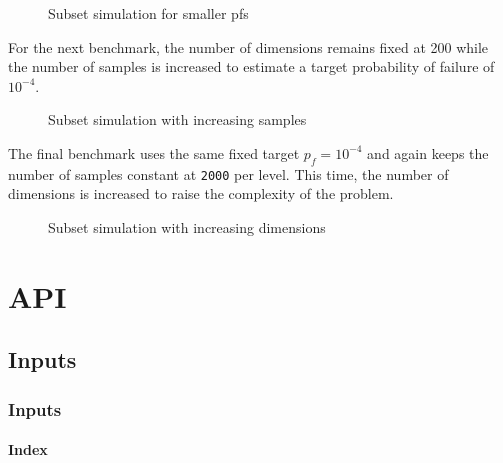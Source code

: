 \begin{figure}
\centering
\caption{Subset simulation for smaller pfs}
\end{figure}




For the next benchmark, the number of dimensions remains fixed at 200 while the  number of samples is increased to estimate a target probability of failure of \(10^{-4}\).



\begin{figure}
\centering
\caption{Subset simulation with increasing samples}
\end{figure}




The final benchmark uses the same fixed target \(p_{f} = 10^{-4}\) and again keeps the number of samples constant at \texttt{2000} per level. This time, the number of dimensions is increased to raise the complexity of the problem.



\begin{figure}
\centering
\caption{Subset simulation with increasing dimensions}
\end{figure}




\part{API}


\chapter{Inputs}


\section{Inputs}



\label{509063468412031875}{}


\subsection{Index}



\label{6663683553518785561}{}

